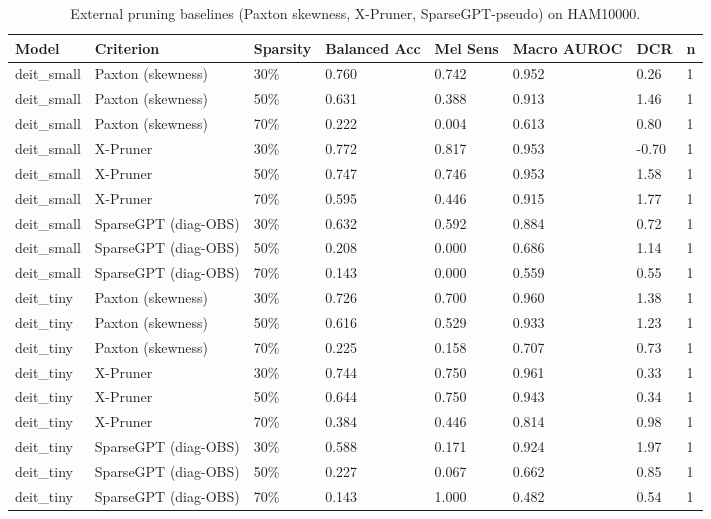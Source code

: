 \begin{table}[t]
\centering
\small
\begin{tabular}{llllllll}
\toprule
Model & Criterion & Sparsity & Balanced Acc & Mel Sens & Macro AUROC & DCR & n \\
\midrule
deit\_small & Paxton (skewness) & 30\% & 0.760 & 0.742 & 0.952 & 0.26 & 1 \\
deit\_small & Paxton (skewness) & 50\% & 0.631 & 0.388 & 0.913 & 1.46 & 1 \\
deit\_small & Paxton (skewness) & 70\% & 0.222 & 0.004 & 0.613 & 0.80 & 1 \\
deit\_small & X-Pruner & 30\% & 0.772 & 0.817 & 0.953 & -0.70 & 1 \\
deit\_small & X-Pruner & 50\% & 0.747 & 0.746 & 0.953 & 1.58 & 1 \\
deit\_small & X-Pruner & 70\% & 0.595 & 0.446 & 0.915 & 1.77 & 1 \\
deit\_small & SparseGPT (diag-OBS) & 30\% & 0.632 & 0.592 & 0.884 & 0.72 & 1 \\
deit\_small & SparseGPT (diag-OBS) & 50\% & 0.208 & 0.000 & 0.686 & 1.14 & 1 \\
deit\_small & SparseGPT (diag-OBS) & 70\% & 0.143 & 0.000 & 0.559 & 0.55 & 1 \\
deit\_tiny & Paxton (skewness) & 30\% & 0.726 & 0.700 & 0.960 & 1.38 & 1 \\
deit\_tiny & Paxton (skewness) & 50\% & 0.616 & 0.529 & 0.933 & 1.23 & 1 \\
deit\_tiny & Paxton (skewness) & 70\% & 0.225 & 0.158 & 0.707 & 0.73 & 1 \\
deit\_tiny & X-Pruner & 30\% & 0.744 & 0.750 & 0.961 & 0.33 & 1 \\
deit\_tiny & X-Pruner & 50\% & 0.644 & 0.750 & 0.943 & 0.34 & 1 \\
deit\_tiny & X-Pruner & 70\% & 0.384 & 0.446 & 0.814 & 0.98 & 1 \\
deit\_tiny & SparseGPT (diag-OBS) & 30\% & 0.588 & 0.171 & 0.924 & 1.97 & 1 \\
deit\_tiny & SparseGPT (diag-OBS) & 50\% & 0.227 & 0.067 & 0.662 & 0.85 & 1 \\
deit\_tiny & SparseGPT (diag-OBS) & 70\% & 0.143 & 1.000 & 0.482 & 0.54 & 1 \\
\bottomrule
\end{tabular}
\caption{External pruning baselines (Paxton skewness, X-Pruner, SparseGPT-pseudo) on HAM10000.}
\label{tab:baselines}
\end{table}